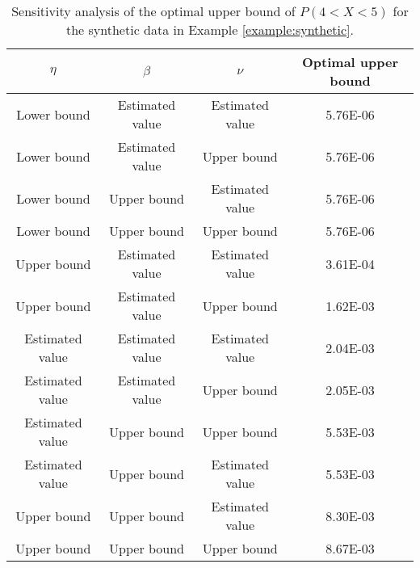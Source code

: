 \begin{table}[ht]
\centering
\begin{tabular}{cccc}
  \hline
$ \eta$ & $ \beta$ & $ \nu$ & Optimal upper bound \\ 
  \hline
Lower bound & Estimated value & Estimated value & 5.76E-06 \\ 
  Lower bound & Estimated value & Upper bound & 5.76E-06 \\ 
  Lower bound & Upper bound & Estimated value & 5.76E-06 \\ 
  Lower bound & Upper bound & Upper bound & 5.76E-06 \\ 
  Upper bound & Estimated value & Estimated value & 3.61E-04 \\ 
  Upper bound & Estimated value & Upper bound & 1.62E-03 \\ 
  Estimated value & Estimated value & Estimated value & 2.04E-03 \\ 
  Estimated value & Estimated value & Upper bound & 2.05E-03 \\ 
  Estimated value & Upper bound & Upper bound & 5.53E-03 \\ 
  Estimated value & Upper bound & Estimated value & 5.53E-03 \\ 
  Upper bound & Upper bound & Estimated value & 8.30E-03 \\ 
  Upper bound & Upper bound & Upper bound & 8.67E-03 \\ 
   \hline
\end{tabular}
\caption{Sensitivity analysis of the optimal upper bound of $P(4<X<5)$ for the synthetic data in Example \ref{example:synthetic}.} 
\label{Tab:Ex SyntD  sensitivity}
\end{table}
